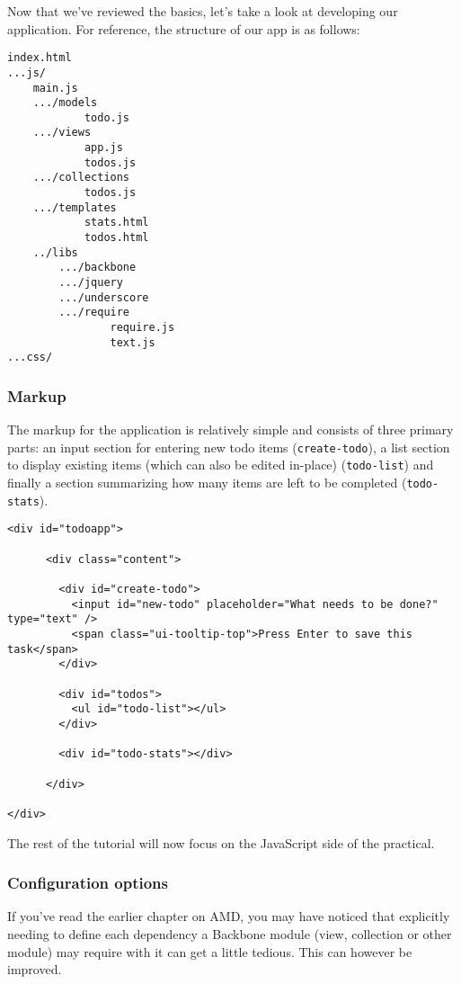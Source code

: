\documentclass[9pt]{book}
\begin{document}
Now that we've reviewed the basics, let's take a look at developing our
application. For reference, the structure of our app is as follows:

\begin{verbatim}
index.html
...js/
    main.js
    .../models
            todo.js
    .../views
            app.js
            todos.js
    .../collections
            todos.js
    .../templates
            stats.html
            todos.html
    ../libs
        .../backbone
        .../jquery
        .../underscore
        .../require
                require.js
                text.js
...css/
\end{verbatim}

\subsubsection{Markup}\label{markup}

The markup for the application is relatively simple and consists of
three primary parts: an input section for entering new todo items
(\texttt{create-todo}), a list section to display existing items (which
can also be edited in-place) (\texttt{todo-list}) and finally a section
summarizing how many items are left to be completed
(\texttt{todo-stats}).

\begin{verbatim}
<div id="todoapp">

      <div class="content">

        <div id="create-todo">
          <input id="new-todo" placeholder="What needs to be done?" type="text" />
          <span class="ui-tooltip-top">Press Enter to save this task</span>
        </div>

        <div id="todos">
          <ul id="todo-list"></ul>
        </div>

        <div id="todo-stats"></div>

      </div>

</div>
\end{verbatim}

The rest of the tutorial will now focus on the JavaScript side of the
practical.

\subsubsection{Configuration options}\label{configuration-options}

If you've read the earlier chapter on AMD, you may have noticed that
explicitly needing to define each dependency a Backbone module (view,
collection or other module) may require with it can get a little
tedious. This can however be improved.
\end{document}

